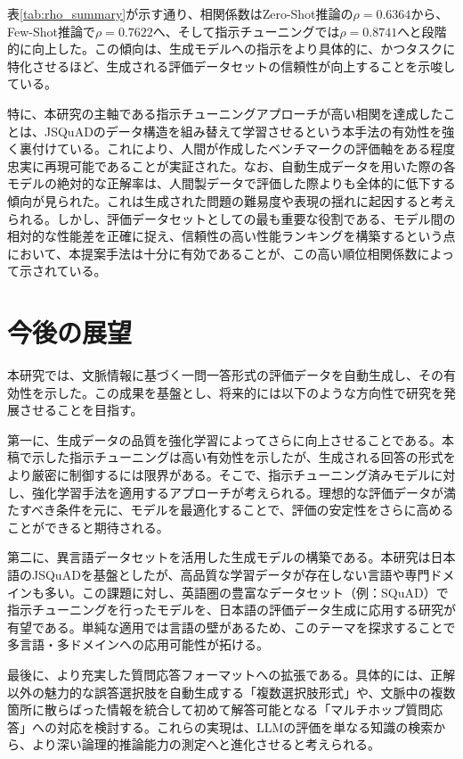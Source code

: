 \documentclass[twocolumn]{jsarticle}
\begin{document}
表\ref{tab:rho_summary}が示す通り、相関係数はZero-Shot推論の$\rho=0.6364$から、Few-Shot推論で$\rho=0.7622$へ、そして指示チューニングでは$\rho=0.8741$へと段階的に向上した。この傾向は、生成モデルへの指示をより具体的に、かつタスクに特化させるほど、生成される評価データセットの信頼性が向上することを示唆している。

特に、本研究の主軸である指示チューニングアプローチが高い相関を達成したことは、JSQuADのデータ構造を組み替えて学習させるという本手法の有効性を強く裏付けている。これにより、人間が作成したベンチマークの評価軸をある程度忠実に再現可能であることが実証された。なお、自動生成データを用いた際の各モデルの絶対的な正解率は、人間製データで評価した際よりも全体的に低下する傾向が見られた。これは生成された問題の難易度や表現の揺れに起因すると考えられる。しかし、評価データセットとしての最も重要な役割である、モデル間の相対的な性能差を正確に捉え、信頼性の高い性能ランキングを構築するという点において、本提案手法は十分に有効であることが、この高い順位相関係数によって示されている。



\section{今後の展望}

本研究では、文脈情報に基づく一問一答形式の評価データを自動生成し、その有効性を示した。この成果を基盤とし、将来的には以下のような方向性で研究を発展させることを目指す。

第一に、生成データの品質を強化学習によってさらに向上させることである。本稿で示した指示チューニングは高い有効性を示したが、生成される回答の形式をより厳密に制御するには限界がある。そこで、指示チューニング済みモデルに対し、強化学習手法を適用するアプローチが考えられる。理想的な評価データが満たすべき条件を元に、モデルを最適化することで、評価の安定性をさらに高めることができると期待される。

第二に、異言語データセットを活用した生成モデルの構築である。本研究は日本語のJSQuAD\cite{JGLUE}を基盤としたが、高品質な学習データが存在しない言語や専門ドメインも多い。この課題に対し、英語圏の豊富なデータセット（例：SQuAD\cite{SQuAD}）で指示チューニングを行ったモデルを、日本語の評価データ生成に応用する研究が有望である。単純な適用では言語の壁があるため、このテーマを探求することで多言語・多ドメインへの応用可能性が拓ける。

最後に、より充実した質問応答フォーマットへの拡張である。具体的には、正解以外の魅力的な誤答選択肢を自動生成する「複数選択肢形式」や、文脈中の複数箇所に散らばった情報を統合して初めて解答可能となる「マルチホップ質問応答」への対応を検討する。これらの実現は、LLMの評価を単なる知識の検索から、より深い論理的推論能力の測定へと進化させると考えられる。
\end{document}
